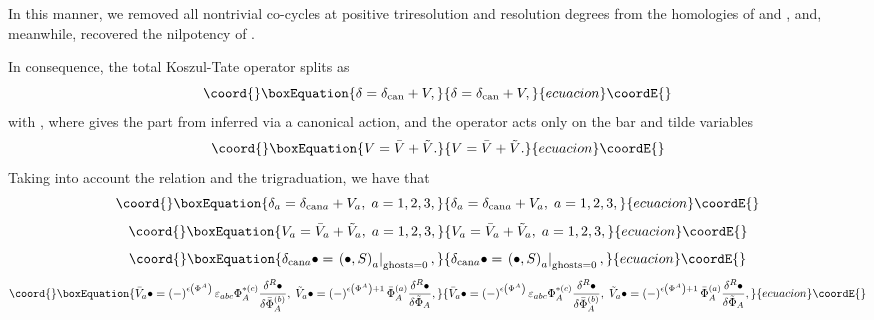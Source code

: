 \documentclass[a4paper,12pt]{article}
\begin{document}
In this manner, we removed all nontrivial co-cycles at positive
triresolution and resolution degrees from the homologies of \coordHE{}
and \myHighlight{$\delta $}\coordHE{}, and, meanwhile, recovered the nilpotency of \myHighlight{$\delta $}\coordHE{}.

In consequence, the total Koszul-Tate operator splits as 
\begin{equation}\coord{}\boxEquation{
\delta =\delta _{\mathrm{can}}+V,  \label{sp3.59}
}{
\delta =\delta _{\mathrm{can}}+V,  }{ecuacion}\coordE{}\end{equation}
with \coordHE{}, where \coordHE{} gives the part from \myHighlight{$\delta $}\coordHE{} inferred via a canonical action, and the
operator \coordHE{} acts only on the bar and tilde variables 
\begin{equation}\coord{}\boxEquation{
V=\bar{V}+\tilde{V}.  \label{sp3.60}
}{
V=\bar{V}+\tilde{V}.  }{ecuacion}\coordE{}\end{equation}
Taking into account the relation \coordHE{} and the trigraduation, we have that 
\begin{equation}\coord{}\boxEquation{
\delta _{a}=\delta _{\mathrm{can}a}+V_{a},\;a=1,2,3,  \label{sp3.61}
}{
\delta _{a}=\delta _{\mathrm{can}a}+V_{a},\;a=1,2,3,  }{ecuacion}\coordE{}\end{equation}
\begin{equation}\coord{}\boxEquation{
V_{a}=\bar{V}_{a}+\tilde{V}_{a},\;a=1,2,3,  \label{sp3.62}
}{
V_{a}=\bar{V}_{a}+\tilde{V}_{a},\;a=1,2,3,  }{ecuacion}\coordE{}\end{equation}
\begin{equation}\coord{}\boxEquation{
\delta _{\mathrm{can}a}\bullet =\left. \left( \bullet ,S\right) _{a}\right|
_{\mathrm{ghosts}=0},  \label{sp3.63}
}{
\delta _{\mathrm{can}a}\bullet =\left. \left( \bullet ,S\right) _{a}\right|
_{\mathrm{ghosts}=0},  }{ecuacion}\coordE{}\end{equation}
\begin{equation}\coord{}\boxEquation{
\bar{V}_{a}\bullet =\left( -\right) ^{\epsilon \left( \Phi ^{A}\right)
}\varepsilon _{abc}\Phi _{A}^{*(c)}\frac{\delta ^{R}\bullet }{\delta \bar{
\Phi}_{A}^{(b)}},\;\tilde{V}_{a}\bullet =\left( -\right) ^{\epsilon \left(
\Phi ^{A}\right) +1}\bar{\Phi}_{A}^{(a)}\frac{\delta ^{R}\bullet }{\delta 
\tilde{\Phi}_{A}},  \label{sp3.64}
}{
\bar{V}_{a}\bullet =\left( -\right) ^{\epsilon \left( \Phi ^{A}\right)
}\varepsilon _{abc}\Phi _{A}^{*(c)}\frac{\delta ^{R}\bullet }{\delta \bar{
\Phi}_{A}^{(b)}},\;\tilde{V}_{a}\bullet =\left( -\right) ^{\epsilon \left(
\Phi ^{A}\right) +1}\bar{\Phi}_{A}^{(a)}\frac{\delta ^{R}\bullet }{\delta 
\tilde{\Phi}_{A}},  }{ecuacion}\coordE{}\end{equation}
\end{document}
